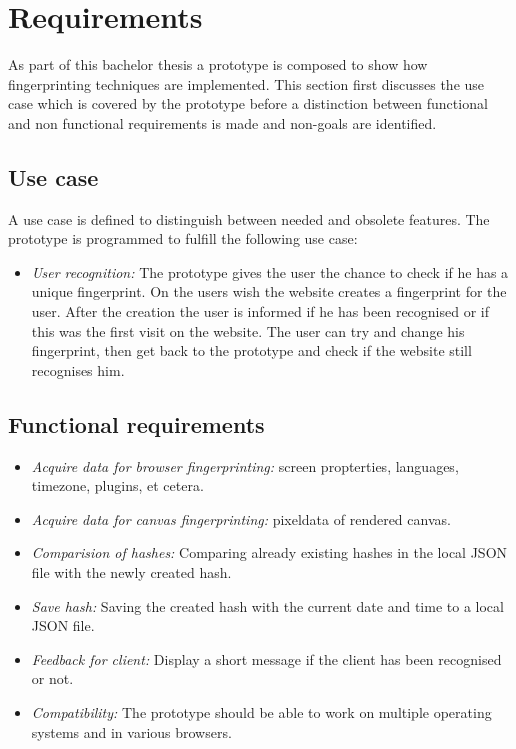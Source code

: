 \chapter{Requirements}
\label{cha:requirements}
As part of this bachelor thesis a prototype is composed  to show how fingerprinting techniques are implemented. This section first discusses the use case which is covered by the prototype before a distinction between functional and non functional requirements is made and non-goals are identified.

\section{Use case}
A use case is defined to distinguish between needed and obsolete features. The prototype is programmed to fulfill the following use case:

\begin{itemize}
	\item \textit{User recognition: } The prototype gives the user the chance to check if he has a unique fingerprint. On the users wish the website creates a fingerprint for the user. After the creation the user is informed if he has been recognised or if this was the first visit on the website. The user can try and change his fingerprint, then get back to the prototype and check if the website still recognises him.
\end{itemize}

\section{Functional requirements}

\begin{itemize}
\item \textit{Acquire data for browser fingerprinting: }
screen propterties, languages, timezone, plugins, et cetera.
\item \textit{Acquire data for canvas fingerprinting: }
pixeldata of rendered canvas.
\item \textit{Comparision of hashes: }Comparing already existing hashes in the local JSON file with the newly created hash.
\item \textit{Save hash: }Saving the created hash with the current date and time to a local JSON file.
\item \textit{Feedback for client: }Display a short message if the client has been recognised or not.
\item \textit{Compatibility: }The prototype should be able to work on multiple operating systems and in various browsers.
\end{itemize}

